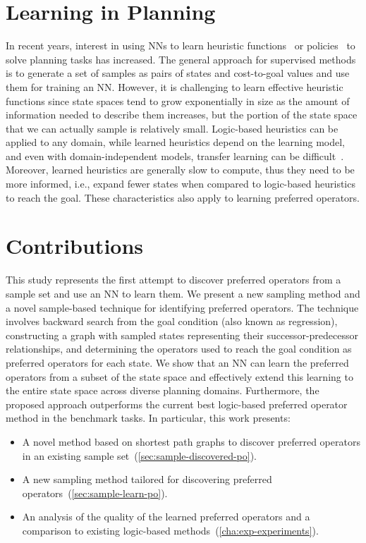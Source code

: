 \documentclass[ppgc,diss,english]{iiufrgs}
\begin{document}
\section{Learning in Planning}
\label{sec:intro-learning-planning}
In recent years, interest in using NNs to learn heuristic functions~\cite{Ferber.etal/2020a,Yu.etal/2020,Shen.etal/2020,Ferber.etal/2022,OToole/2022,Bettker.etal/2022} or policies~\cite{Toyer.etal/2018,Toyer.etal/2020,Stahlberg.etal/2022} to solve planning tasks has increased. The general approach for supervised methods is to generate a set of samples as pairs of states and cost-to-goal values and use them for training an NN. However, it is challenging to learn effective heuristic functions since state spaces tend to grow exponentially in size as the amount of information needed to describe them increases, but the portion of the state space that we can actually sample is relatively small. Logic-based heuristics can be applied to any domain, while learned heuristics depend on the learning model, and even with domain-independent models, transfer learning can be difficult~\cite{Shen.etal/2020}. Moreover, learned heuristics are generally slow to compute, thus they need to be more informed, i.e., expand fewer states when compared to logic-based heuristics to reach the goal. These characteristics also apply to learning preferred operators.

\section{Contributions}
\label{sec:intro-contributions}
This study represents the first attempt to discover preferred operators from a sample set and use an NN to learn them. We present a new sampling method and a novel sample-based technique for identifying preferred operators. The technique involves backward search from the goal condition (also known as regression), constructing a graph with sampled states representing their successor-predecessor relationships, and determining the operators used to reach the goal condition as preferred operators for each state. We show that an NN can learn the preferred operators from a subset of the state space and effectively extend this learning to the entire state space across diverse planning domains. Furthermore, the proposed approach outperforms the current best logic-based preferred operator method in the benchmark tasks. In particular, this work presents:

\begin{itemize}
\item A novel method based on shortest path graphs to discover preferred operators in an existing sample set~(\cref{sec:sample-discovered-po}).
\item A new sampling method tailored for discovering preferred operators~(\cref{sec:sample-learn-po}).
\item An analysis of the quality of the learned preferred operators and a comparison to existing logic-based methods~(\cref{cha:exp-experiments}).
\end{itemize}
%
%
\end{document}
